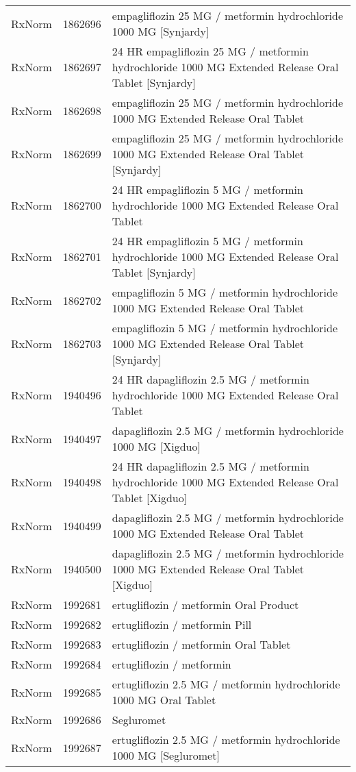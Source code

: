 \begin{longtable}{p{}p{}p{}}
  RxNorm & 1862696 & empagliflozin 25 MG / metformin hydrochloride 1000 MG [Synjardy] \\ 
  RxNorm & 1862697 & 24 HR empagliflozin 25 MG / metformin hydrochloride 1000 MG Extended Release Oral Tablet [Synjardy] \\ 
  RxNorm & 1862698 & empagliflozin 25 MG / metformin hydrochloride 1000 MG Extended Release Oral Tablet \\ 
  RxNorm & 1862699 & empagliflozin 25 MG / metformin hydrochloride 1000 MG Extended Release Oral Tablet [Synjardy] \\ 
  RxNorm & 1862700 & 24 HR empagliflozin 5 MG / metformin hydrochloride 1000 MG Extended Release Oral Tablet \\ 
  RxNorm & 1862701 & 24 HR empagliflozin 5 MG / metformin hydrochloride 1000 MG Extended Release Oral Tablet [Synjardy] \\ 
  RxNorm & 1862702 & empagliflozin 5 MG / metformin hydrochloride 1000 MG Extended Release Oral Tablet \\ 
  RxNorm & 1862703 & empagliflozin 5 MG / metformin hydrochloride 1000 MG Extended Release Oral Tablet [Synjardy] \\ 
  RxNorm & 1940496 & 24 HR dapagliflozin 2.5 MG / metformin hydrochloride 1000 MG Extended Release Oral Tablet \\ 
  RxNorm & 1940497 & dapagliflozin 2.5 MG / metformin hydrochloride 1000 MG [Xigduo] \\ 
  RxNorm & 1940498 & 24 HR dapagliflozin 2.5 MG / metformin hydrochloride 1000 MG Extended Release Oral Tablet [Xigduo] \\ 
  RxNorm & 1940499 & dapagliflozin 2.5 MG / metformin hydrochloride 1000 MG Extended Release Oral Tablet \\ 
  RxNorm & 1940500 & dapagliflozin 2.5 MG / metformin hydrochloride 1000 MG Extended Release Oral Tablet [Xigduo] \\ 
  RxNorm & 1992681 & ertugliflozin / metformin Oral Product \\ 
  RxNorm & 1992682 & ertugliflozin / metformin Pill \\ 
  RxNorm & 1992683 & ertugliflozin / metformin Oral Tablet \\ 
  RxNorm & 1992684 & ertugliflozin / metformin \\ 
  RxNorm & 1992685 & ertugliflozin 2.5 MG / metformin hydrochloride 1000 MG Oral Tablet \\ 
  RxNorm & 1992686 & Segluromet \\ 
  RxNorm & 1992687 & ertugliflozin 2.5 MG / metformin hydrochloride 1000 MG [Segluromet] \\ 

\end{longtable}
